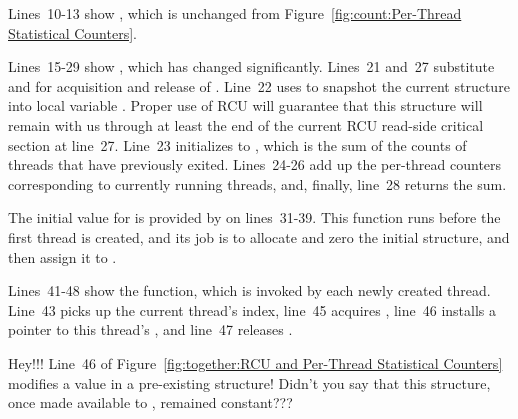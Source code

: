 Lines~10-13 show , which is unchanged from
Figure~\ref{fig:count:Per-Thread Statistical Counters}.

Lines~15-29 show , which has changed significantly.
Lines~21 and~27 substitute  and
 for acquisition and release of .
Line~22 uses  to snapshot the
current  structure into local variable .
Proper use of RCU will guarantee that this  structure
will remain with us through at least the end of the current RCU
read-side critical section at line~27.
Line~23 initializes  to , which is the
sum of the counts of threads that have previously exited.
Lines~24-26 add up the per-thread counters corresponding to currently
running threads, and, finally, line~28 returns the sum.

The initial value for  is
provided by  on lines~31-39.
This function runs before the first thread is created, and its job
is to allocate
and zero the initial structure, and then assign it to .

Lines~41-48 show the  function, which
is invoked by each newly created thread.
Line~43 picks up the current thread's index, line~45 acquires
, line~46 installs a pointer to this thread's
, and line~47 releases .

\QuickQuiz{}
	Hey!!!
	Line~46 of
	Figure~\ref{fig:together:RCU and Per-Thread Statistical Counters}
	modifies a value in a pre-existing  structure!
	Didn't you say that this structure, once made available to
	, remained constant???
 \QuickQuizEnd

